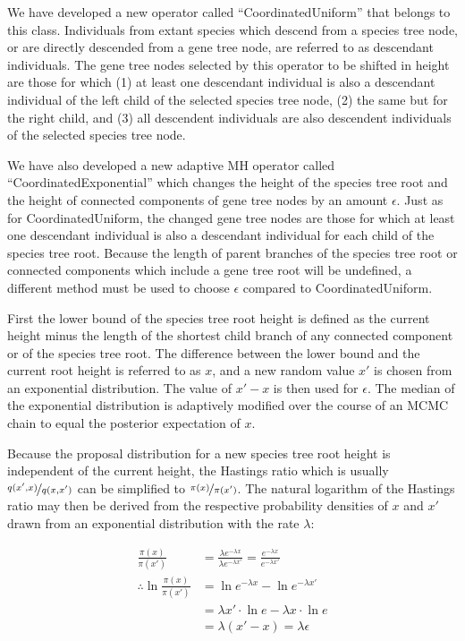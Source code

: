 \documentclass[12pt]{article}
\begin{document}
We have developed a new operator called ``CoordinatedUniform'' that belongs to
this class. Individuals from extant species which descend from a species tree
node, or are directly descended from a gene tree node, are referred to as
descendant individuals. The gene tree nodes selected by this operator to be shifted in height are those
for which (1) at least one descendant individual is also a descendant individual
of the left child of the selected species tree node, (2) the same but for the right child, and (3) all descendent
individuals are also descendent individuals of the selected species tree node.

We have also developed a new adaptive MH \citep{Andrieu2008} operator called
``CoordinatedExponential'' which changes the height of the species tree root and
the height of connected components of gene tree nodes by an amount $\epsilon$.
Just as for CoordinatedUniform, the changed gene tree nodes are those for which at least one descendant individual
is also a descendant individual for each child of the species tree root.
Because the length of parent branches of the species tree root or connected
components which include a gene tree root will be undefined, a different method must be used to choose
$\epsilon$ compared to CoordinatedUniform.

First the lower bound of the species tree root height is defined as the current
height minus the length of the shortest child branch of any connected component or
of the species tree root. The difference between the lower bound and the current
root height is referred to as $x$, and a new random value $x'$ is chosen from an
exponential distribution. The value of $x' - x$ is then used for $\epsilon$. The
median of the exponential distribution is adaptively modified over the course of
an MCMC chain to equal the posterior expectation of $x$.

Because the proposal distribution for a new species tree root height is
independent of the current height, the Hastings ratio which is usually
$\nicefrac{q(x',x)}{q(x,x')}$ \citep{Hastings1970} can be simplified to
$\nicefrac{\pi(x)}{\pi(x')}$. The natural logarithm of the Hastings ratio may then
be derived from the respective probability densities of $x$ and
$x'$ drawn from an exponential distribution with the rate $\lambda$:

\begin{align}
\frac{\pi(x)}{\pi(x')} &= \frac{\lambda e^{-\lambda x}}{\lambda e^{-\lambda x'}} = \frac{e^{-\lambda x}}{e^{-\lambda x'}}\\
\therefore \ln\frac{\pi(x)}{\pi(x')} &= \ln e^{-\lambda x} - \ln e^{-\lambda x'}\\
& = \lambda x' \cdot \ln e - \lambda x \cdot \ln e\\
& = \lambda \left(x' - x\right) = \lambda \epsilon
\end{align}
\end{document}
